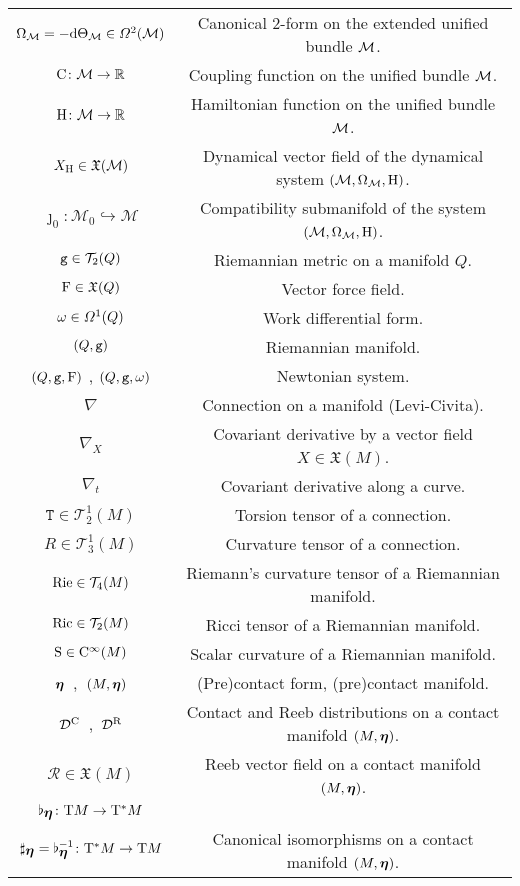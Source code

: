 \documentclass[12pt]{report}
\def\vf{\mathfrak X}
\def\df{{\mit\Omega}}
\def\d{{\rm d}}
\def\Real{\mathbb{R}}
\def\bmeta{\mbox{\boldmath $\eta$}}
\def\Tan{{\rm T}}
\def\Cinfty{{\rm C}^\infty}
\newcommand{\Reeb}{\mathcal{R}}
\begin{document}
\begin{center}
{\begin{tabular}{|c|c|}
$\Omega_{\cal M}=-\d\Theta_{\cal M}\in\df^2({\cal M})$ &
Canonical $2$-form on the extended unified bundle ${\cal M}$. \\ 
${\rm C}\colon{\cal M}\to\Real$ &
Coupling function on the unified bundle ${\cal M}$. \\
${\rm H}\colon{\cal M}\to\Real$ &
Hamiltonian function on the unified bundle ${\cal M}$. \\
$X_{\rm H}\in\vf({\cal M})$ &
Dynamical vector field of the dynamical system $({\cal M},\Omega_{\cal M},{\rm H})$. \\
$\jmath_0\colon\mathcal{M}_0\hookrightarrow\mathcal{M}$ &
Compatibility submanifold of the system $({\cal M},\Omega_{\cal M},{\rm H})$. \\
${\tt g}\in{\cal T}_2(Q)$ & Riemannian metric on a manifold $Q$. \\
${\rm F}\in\vf (Q)$ & Vector force field. \\
$\omega\in\df^1 (Q)$ & Work differential form. \\
$(Q,{\tt g})$ & Riemannian manifold. \\
$(Q,{\tt g},{\rm F})$ , $(Q,{\tt g},\omega)$ & Newtonian system. \\
$\nabla$ & Connection on a manifold (Levi-Civita). \\
$\nabla_X$ & Covariant derivative by a vector field $X\in\vf(M)$. \\
$\nabla_t$ & Covariant derivative along a curve. \\
${\mathtt T}\in{\mathcal T}_2^1(M)$ & Torsion tensor of a connection. \\
${\mathit R}\in{\mathcal T}_3^1(M)$ & Curvature tensor of a connection. \\
${\rm Rie}\in{\mathcal T}_4(M)$ & Riemann's curvature tensor of a Riemannian manifold. \\
${\rm Ric}\in{\mathcal T}_2(M)$ & Ricci tensor of a Riemannian manifold. \\
${\rm S}\in\Cinfty(M)$ & Scalar curvature of a Riemannian manifold. \\
$\bmeta$\ ,\ $(M,\bmeta)$ & (Pre)contact form, (pre)contact manifold. \\
$\mathcal{D}^{\rm C}$\ ,\ $\mathcal{D}^{\rm R}$ &
Contact and Reeb distributions on a contact manifold $(M,\bmeta)$.\\
$\Reeb\in\vf(M)$ & Reeb vector field on a contact manifold $(M,\bmeta)$. \\
$\flat_{\bmeta}\colon\Tan M\to\Tan^*M$ & \\
$\sharp_{\bmeta}=\flat_{\bmeta}^{-1}\colon\Tan^* M\to\Tan M$ & Canonical isomorphisms on a contact manifold $(M,\bmeta)$. \\

\end{tabular}}
\end{center}
\end{document}
